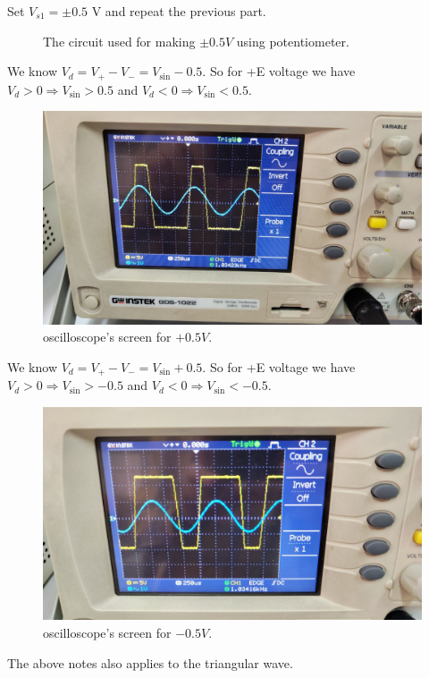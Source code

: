 \documentclass[11pt]{article}
\newcommand{\PicScale}{0.2}
\begin{document}
\begin{question}
\begin{subquestion}{Set $V_{s1}=\pm 0.5$ V and repeat the previous part.}
{\begin{figure}[H]
                \caption{The circuit used for making $\pm 0.5V$ using potentiometer.}
            \end{figure}
            We know $V_d = V_+ - V_- = V_{\sin} - 0.5$. So for +E voltage we have $V_d > 0 \Rightarrow V_{\sin} > 0.5$ and $V_d < 0 \Rightarrow V_{\sin} < 0.5$.
            \begin{figure}[H]
                \centering
                \includegraphics[scale=\PicScale,angle=0]{Fig/7.jpeg}
                \caption{oscilloscope's screen for $+0.5V$.}
            \end{figure}
            We know $V_d = V_+ - V_- = V_{\sin} + 0.5$. So for +E voltage we have $V_d > 0 \Rightarrow V_{\sin} > -0.5$ and $V_d < 0 \Rightarrow V_{\sin} < -0.5$.
            \begin{figure}[H]
                \centering
                \includegraphics[scale=\PicScale,angle=0]{Fig/9.jpeg}
                \caption{oscilloscope's screen for $-0.5V$.}
            \end{figure}
            The above notes also applies to the triangular wave.
            \begin{figure}[H]

\end{figure}}
\end{subquestion}
\end{question}
\end{document}
